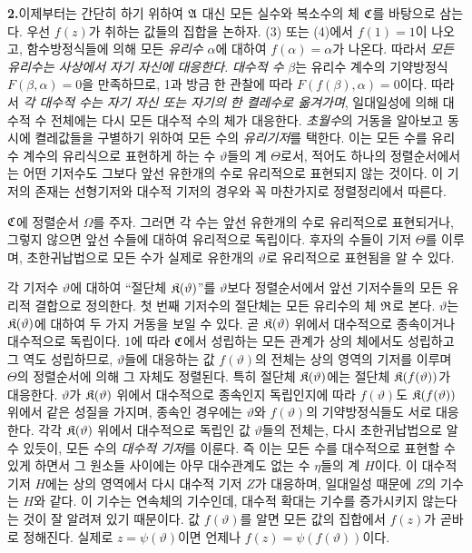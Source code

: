 \medskip
\noindent\textbf{2.}\quad 이제부터는 간단히 하기 위하여 \(\mathfrak A\) 대신 모든 실수와 복소수의 체 \(\mathfrak C\)를 바탕으로 삼는다. 우선 \(f(z)\)가 취하는 값들의 집합을 논하자. (3) 또는 (4)에서 \(f(1)=1\)이 나오고, 함수방정식들에 의해 모든 \emph{유리수} \(\alpha\)에 대하여 \(f(\alpha)=\alpha\)가 나온다. 따라서 \emph{모든 유리수는 사상에서 자기 자신에 대응한다.} \emph{대수적 수} \(\beta\)는 유리수 계수의 기약방정식 \(F(\beta,\alpha)=0\)을 만족하므로, 1과 방금 한 관찰에 따라 \(F(f(\beta),\alpha)=0\)이다. 따라서 \emph{각 대수적 수는 자기 자신 또는 자기의 한 켤레수로 옮겨가며}, 일대일성에 의해 대수적 수 전체에는 다시 모든 대수적 수의 체가 대응한다. \emph{초월수}의 거동을 알아보고 동시에 켤레값들을 구별하기 위하여 모든 수의 \emph{유리기저}를 택한다. 이는 모든 수를 유리수 계수의 유리식으로 표현하게 하는 수 \(\vartheta\)들의 계 \(\Theta\)로서, 적어도 하나의 정렬순서에서는 어떤 기저수도 그보다 앞선 유한개의 수로 유리적으로 표현되지 않는 것이다. 이 기저의 존재는 선형기저와 대수적 기저의 경우와 꼭 마찬가지로 정렬정리에서 따른다.

\(\mathfrak C\)에 정렬순서 \(\Omega\)를 주자. 그러면 각 수는 앞선 유한개의 수로 유리적으로 표현되거나, 그렇지 않으면 앞선 수들에 대하여 유리적으로 독립이다. 후자의 수들이 기저 \(\Theta\)를 이루며, 초한귀납법으로 모든 수가 실제로 유한개의 \(\vartheta\)로 유리적으로 표현됨을 알 수 있다.

각 기저수 \(\vartheta\)에 대하여 ``절단체 \(\mathfrak K(\vartheta)\)''를 \(\vartheta\)보다 정렬순서에서 앞선 기저수들의 모든 유리적 결합으로 정의한다. 첫 번째 기저수의 절단체는 모든 유리수의 체 \(\mathfrak R\)로 본다. \(\vartheta\)는 \(\mathfrak K(\vartheta)\)에 대하여 두 가지 거동을 보일 수 있다. 곧 \(\mathfrak K(\vartheta)\) 위에서 대수적으로 종속이거나 대수적으로 독립이다. 1에 따라 \(\mathfrak C\)에서 성립하는 모든 관계가 상의 체에서도 성립하고 그 역도 성립하므로, \(\vartheta\)들에 대응하는 값 \(f(\vartheta)\)의 전체는 상의 영역의 기저를 이루며 \(\Theta\)의 정렬순서에 의해 그 자체도 정렬된다. 특히 절단체 \(\mathfrak K(\vartheta)\)에는 절단체 \(\mathfrak K(f(\vartheta))\)가 대응한다. \(\vartheta\)가 \(\mathfrak K(\vartheta)\) 위에서 대수적으로 종속인지 독립인지에 따라 \(f(\vartheta)\)도 \(\mathfrak K(f(\vartheta))\) 위에서 같은 성질을 가지며, 종속인 경우에는 \(\vartheta\)와 \(f(\vartheta)\)의 기약방정식들도 서로 대응한다. 각각 \(\mathfrak K(\vartheta)\) 위에서 대수적으로 독립인 값 \(\vartheta\)들의 전체는, 다시 초한귀납법으로 알 수 있듯이, 모든 수의 \emph{대수적 기저}를 이룬다. 즉 이는 모든 수를 대수적으로 표현할 수 있게 하면서 그 원소들 사이에는 아무 대수관계도 없는 수 \(\eta\)들의 계 \(H\)이다. 이 대수적 기저 \(H\)에는 상의 영역에서 다시 대수적 기저 \(Z\)가 대응하며, 일대일성 때문에 \(Z\)의 기수는 \(H\)와 같다. 이 기수는 연속체의 기수인데, 대수적 확대는 기수를 증가시키지 않는다는 것이 잘 알려져 있기 때문이다. 값 \(f(\vartheta)\)를 알면 모든 값의 집합에서 \(f(z)\)가 곧바로 정해진다. 실제로 \(z=\psi(\vartheta)\)이면 언제나 \(f(z)=\psi(f(\vartheta))\)이다.

